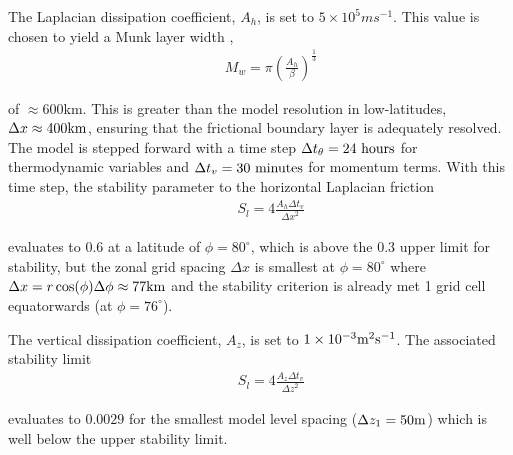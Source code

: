 The Laplacian dissipation coefficient, $A_{h}$, is set to $5 \times 10^5 m s^{-1}$.
This value is chosen to yield a Munk layer width \citep{adcroft:95},
\begin{eqnarray}
\label{eq:eg-global-munk_layer}
&& M_{w} = \pi ( \frac { A_{h} }{ \beta } )^{\frac{1}{3}}
\end{eqnarray}

\noindent  of $\approx 600$km. This is greater than the model
resolution in low-latitudes, $\Delta x \approx 400{\rm km}$, ensuring that the frictional
boundary layer is adequately resolved.
\\

\noindent The model is stepped forward with a time step $\Delta
t_{\theta}=24~{\rm hours}$ for thermodynamic variables and $\Delta
t_{v}=30~{\rm minutes}$ for momentum terms. With this time step,
the stability parameter to the horizontal Laplacian friction
\citep{adcroft:95}
\begin{eqnarray}
\label{eq:eg-global-laplacian_stability}
&& S_{l} = 4 \frac{A_{h} \Delta t_{v}}{{\Delta x}^2}
\end{eqnarray}

\noindent evaluates to 0.6 at a latitude of $\phi=80^{\circ}$, which
is above the 0.3 upper limit for stability, but the zonal grid spacing
$\Delta x$ is smallest at $\phi=80^{\circ}$ where $\Delta
x=r\cos(\phi)\Delta \phi\approx 77{\rm km}$ and the stability
criterion is already met 1 grid cell equatorwards (at $\phi=76^{\circ}$).


\noindent The vertical dissipation coefficient, $A_{z}$, is set to
$1\times10^{-3} {\rm m}^2{\rm s}^{-1}$. The associated stability limit
\begin{eqnarray}
\label{eq:eg-global-laplacian_stability_z}
&& S_{l} = 4 \frac{A_{z} \Delta t_{v}}{{\Delta z}^2}
\end{eqnarray}

\noindent evaluates to $0.0029$ for the smallest model
level spacing ($\Delta z_{1}=50{\rm m}$) which is well below
the upper stability limit.
\\


